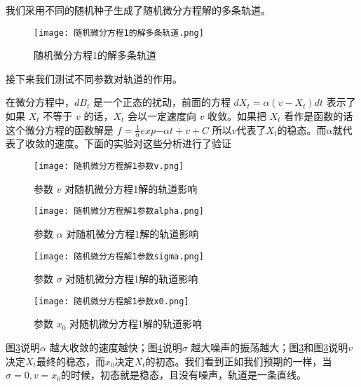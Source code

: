 \documentclass{article}
\begin{document}
我们采用不同的随机种子生成了随机微分方程解的多条轨道。

\begin{figure}[H]
    \centering
    \texttt{[image: 随机微分方程1的解多条轨道.png]}
    \caption{随机微分方程1的解多条轨道}
    \label{fig:SDE1}
    \end{figure}







接下来我们测试不同参数对轨道的作用。

在微分方程中，$d B_t$ 是一个正态的扰动，前面的方程 $d X_{t}=\alpha\left(v-X_{t}\right) d t$ 表示了如果 $X_t$ 不等于 $v$ 的话，$X_t$ 会以一定速度向 $v$ 收敛。如果把 $X_t$ 看作是函数的话这个微分方程的函数解是 $f = \frac{1}{\alpha} exp{-\alpha t} + v + C$ 所以$v$代表了$X_t$的稳态。而$\alpha$就代表了收敛的速度。下面的实验对这些分析进行了验证


\begin{figure}[H]
    \centering
    \texttt{[image: 随机微分方程解1参数v.png]}
    \caption{参数 $v$ 对随机微分方程1解的轨道影响}
    \label{fig:SDE1_v}
    \end{figure}



\begin{figure}[H]
    \centering
    \texttt{[image: 随机微分方程解1参数alpha.png]}
    \caption{参数 $\alpha$ 对随机微分方程1解的轨道影响}
    \label{fig:SDE1_alpha}
    \end{figure}





\begin{figure}[H]
    \centering
    \texttt{[image: 随机微分方程解1参数sigma.png]}
    \caption{参数 $\sigma$ 对随机微分方程1解的轨道影响}
    \label{fig:SDE1_sigma}
    \end{figure}


\begin{figure}[H]
    \centering
    \texttt{[image: 随机微分方程解1参数x0.png]}
    \caption{参数 $x_0$ 对随机微分方程1解的轨道影响}
    \label{fig:SDE1_x0}
    \end{figure}


图\ref{fig:SDE1_alpha}说明$\alpha$ 越大收敛的速度越快；图\ref{fig:SDE1_sigma}说明$\sigma$ 越大噪声的振荡越大；图\ref{fig:SDE1_alpha}和图\ref{fig:SDE1_alpha}说明$v$ 决定$X_t$最终的稳态，而$x_0$决定$X_t$的初态。我们看到正如我们预期的一样，当$\sigma=0, v = x_0$的时候，初态就是稳态，且没有噪声，轨道是一条直线。
\end{document}
